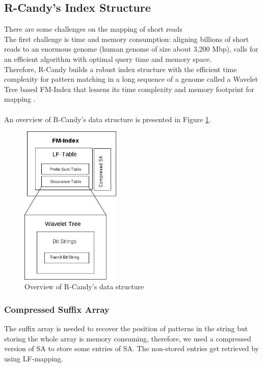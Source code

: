 \documentclass[11pt,a4paper]{report}
\begin{document}
\subsection{R-Candy's Index Structure} \label{R-Candy's Index Structure}

There are some challenges on the mapping of short reads\\
The first challenge is time and memory consumption: aligning billions of short
reads to an enormous genome (human genome of size about 3,200 Mbp), 
calls for an efficient algorithm with optimal query time and memory space.\\
Therefore, R-Candy builds a robust index structure with 
the efficient time complexity for pattern matching in a long sequence of a genome
called a Wavelet Tree based FM-Index that lessens its time complexity and memory footprint for mapping . 
\\\\
An overview of R-Candy's data structure is presented in Figure \ref{DSOverview}\cite{Wavthesis}.\\

\begin{figure}[H]
\centering
\includegraphics[width=4.75cm]{pictures/DSOverview2.png}
\caption{Overview of R-Candy's data structure }
\label{DSOverview}
\end{figure}


\subsubsection{Compressed Suffix Array} \label{Compressed Suffix Array}
The suffix array is needed to recover the position of patterns in the string
but storing the whole array is memory consuming, therefore, we used a
compressed version of SA to store some entries of SA.
The non-stored entries get retrieved by using LF-mapping.
\end{document}
